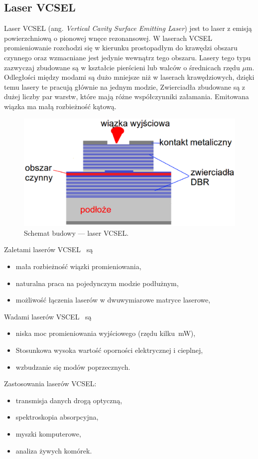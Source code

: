 \subsection{Laser VCSEL}
Laser VCSEL (ang. \textit{Vertical Cavity Surface Emitting Laser}) jest to laser z emisją powierzchniową o pionowej wnęce rezonansowej.
W laserach VCSEL promieniowanie rozchodzi się w kierunku prostopadłym do krawędzi obszaru czynnego oraz wzmacniane jest jedynie
wewnątrz tego obszaru\cite{publikcja_nakwaski}. Lasery tego typu zazwyczaj zbudowane są w kształcie pierścieni lub walców o średnicach rzędu $\mu$m.
Odległości między modami są dużo mniejsze niż w laserach krawędziowych, dzięki temu lasery te pracują głównie na jednym modzie,
Zwierciadła zbudowane są z dużej liczby par warstw, które mają różne współczynniki załamania. Emitowana wiązka ma małą rozbieżność kątową.
\begin{figure}[H]
\center
\includegraphics[scale=0.25]{vcsel2.eps}
\caption{Schemat budowy --- laser VCSEL.}
\label{fig:teoria_rys_3}
\end{figure}
Zaletami laserów VCSEL~\cite{publikcja_nakwaski} są
\begin{itemize}
\item mała rozbieżność wiązki promieniowania,
\item naturalna praca na pojedynczym modzie podłużnym,
\item możliwość łączenia laserów w dwuwymiarowe matryce laserowe,
\end{itemize}
Wadami laserów VSCEL~\cite{publikcja_nakwaski} są
\begin{itemize}
\item niska moc promieniowania wyjściowego (rzędu kilku \,mW),
\item Stosunkowa wysoka wartość oporności elektrycznej i cieplnej,
\item wzbudzanie się modów poprzecznych.
\end{itemize}
Zastosowania laserów VCSEL:
\begin{itemize}
\item transmisja danych drogą optyczną,
\item spektroskopia absorpcyjna,
\item myszki komputerowe,
\item analiza żywych komórek.
\end{itemize}
\newpage

